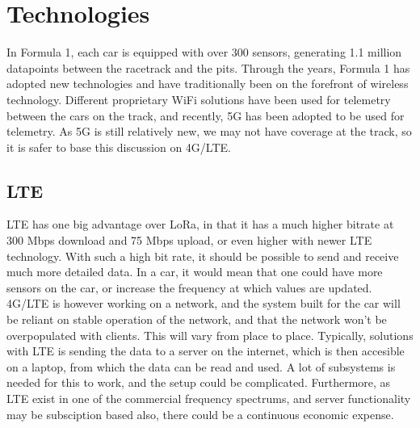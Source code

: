 \section{Technologies}
In Formula 1, each car is equipped with over 300 sensors, generating 1.1 million datapoints between the racetrack and the pits\cite{DCFrontier}. Through the years, Formula 1 has adopted new technologies and have traditionally been on the forefront of wireless technology. Different proprietary WiFi solutions have been used for telemetry between the cars on the track, and recently, 5G has been adopted to be used for telemetry\cite{FastCompany}. As 5G is still relatively new, we may not have coverage at the track, so it is safer to base this discussion on 4G/LTE.

\subsection{LTE}
LTE has one big advantage over LoRa, in that it has a much higher bitrate at 300 Mbps download and 75 Mbps upload, or even higher with newer LTE technology\cite{MobilePDF}. With such a high bit rate, it should be possible to send and receive much more detailed data. In a car, it would mean that one could have more sensors on the car, or increase the frequency at which values are updated. 4G/LTE is however working on a network, and the system built for the car will be reliant on stable operation of the network, and that the network won't be overpopulated with clients. This will vary from place to place. Typically, solutions with LTE is sending the data to a server on the internet, which is then accesible on a laptop, from which the data can be read and used. A lot of subsystems is needed for this to work, and the setup could be complicated. Furthermore, as LTE exist in one of the commercial frequency spectrums, and server functionality may be subsciption based also, there could be a continuous economic expense.\newline

